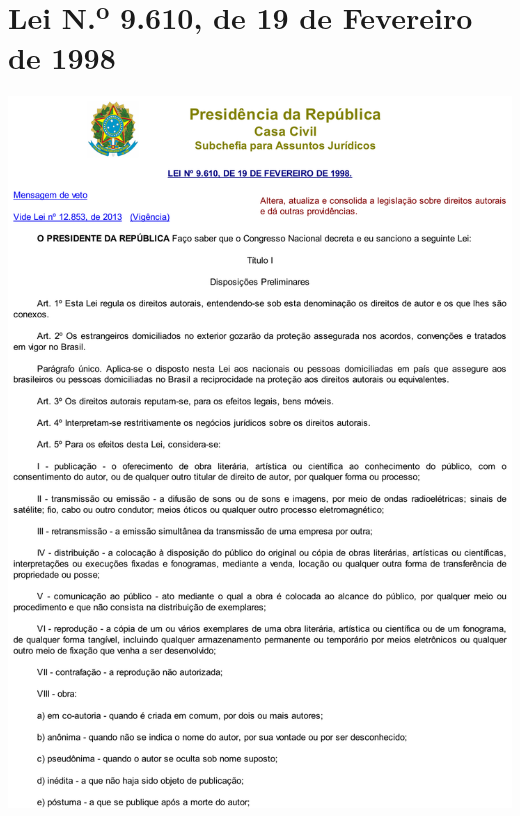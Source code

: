 
\anexos
\chapter{Lei N\texorpdfstring{.\textsuperscript{o}}{o.} 9.610, de 19 de Fevereiro de 1998}\label{cap:anexoa}

\centerline{\includegraphics[width=\textwidth]{./PosTexto/Ilustracoes/lei-n9610-p1}}%


